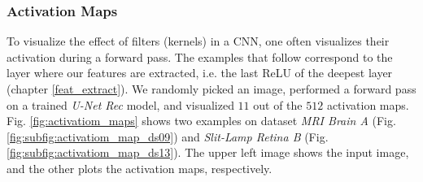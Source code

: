 


\clearpage
\subsubsection{Activation Maps} \label{ch:act_maps}
To visualize the effect of filters (kernels) in a CNN, one often visualizes their activation during a forward pass.
The examples that follow correspond to the layer where our features are extracted, i.e. the last ReLU of the deepest layer (chapter \ref{feat_extract}). We randomly picked an image, performed a forward pass on a trained \textit{U-Net Rec} model, and visualized $11$ out of the $512$ activation maps. Fig. \ref{fig:activatiom_maps} shows two examples on dataset \textit{MRI Brain A} (Fig. \ref{fig:subfig:activatiom_map_ds09}) and \textit{Slit-Lamp Retina B} (Fig. \ref{fig:subfig:activatiom_map_ds13}). The upper left image shows the input image, and the other plots the activation maps, respectively.

